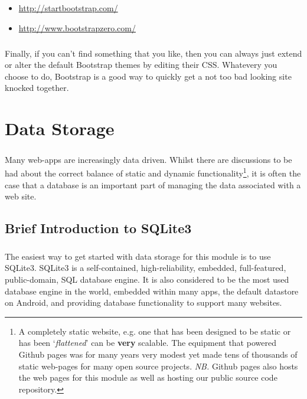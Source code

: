 \documentclass[12pt, a4paper, oneside]{book}
\begin{document}
{\begin{itemize}
\item \url{http://startbootstrap.com/}
\item \url{http://www.bootstrapzero.com/}
\end{itemize}

\paragraph{} Finally, if you can't find something that you like, then you can always just extend or alter the default Bootstrap themes by editing their CSS. Whatevery you choose to do, Bootstrap is a good way to quickly get a not too bad looking site knocked together.


\chapter{Data Storage}
\label{lab08}
\paragraph{} Many web-apps are increasingly data driven. Whilst there are discussions to be had about the correct balance of static and dynamic functionality\footnote{A completely static website, e.g. one that has been designed to be static or has been `\emph{flattened}' can be {\bf{very}} scalable. The equipment that powered Github pages was for many years very modest yet made tens of thousands of static web-pages for many open source projects. \emph{NB.} Github pages also hosts the web pages for this module as well as hosting our public source code repository.}, it is often the case that a database is an important part of managing the data associated with a web site.

\section{Brief Introduction to SQLite3}
\label{sqlite3-intro}
\paragraph{} The easiest way to get started with data storage for this module is to use SQLite3. SQLite3 is a self-contained, high-reliability, embedded, full-featured, public-domain, SQL database engine. It is also considered to be the most used database engine in the world, embedded within many apps, the default datastore on Android, and providing database functionality to support many websites.

}
\end{document}
